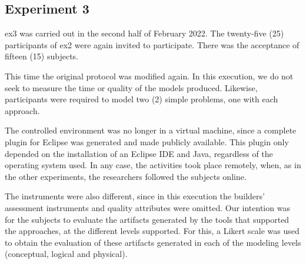 \subsection{Experiment 3}
\label{ssec_experiments:Experiment3}

\ac{ex3} was carried out in the second half of February 2022.
The twenty-five (25) participants of \ac{ex2} were again invited to participate.
There was the acceptance of fifteen (15) subjects.

This time the original protocol was modified again.
In this execution, we do not seek to measure the time or quality of the models produced.
Likewise, participants were required to model two (2) simple problems, one with each approach.

The controlled environment was no longer in a virtual machine, since a complete plugin for Eclipse was generated and made publicly available.
This plugin only depended on the installation of an Eclipse IDE and Java, regardless of the operating system used.
In any case, the activities took place remotely, when, as in the other experiments, the researchers followed the subjects online.

The instruments were also different, since in this execution the builders' assessment instruments and quality attributes were omitted.
Our intention was for the subjects to evaluate the artifacts generated by the tools that supported the approaches, at the different levels supported.
For this, a Likert scale was used to obtain the evaluation of these artifacts generated in each of the modeling levels (conceptual, logical and physical).

